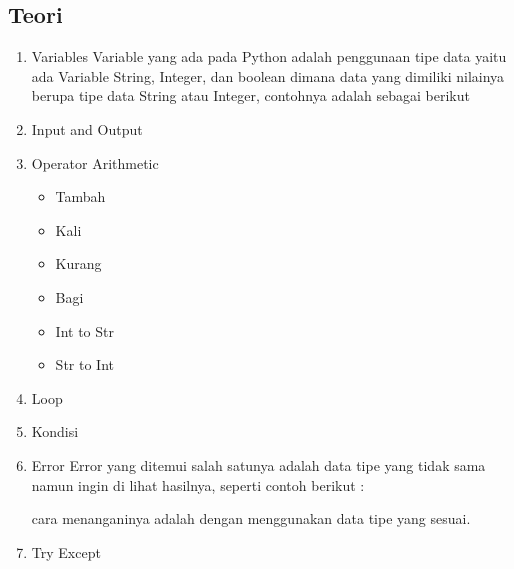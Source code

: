 \subsection{Teori}
	\begin{enumerate}
	\item Variables
	\subitem
	Variable yang ada pada Python adalah penggunaan tipe data yaitu ada Variable String,  Integer, dan boolean dimana data yang dimiliki nilainya berupa tipe data String atau Integer, contohnya adalah sebagai berikut
	\item Input and Output
		
	\item Operator Arithmetic
	\begin{itemize}
	\item Tambah
		
	\item Kali
		
	\item Kurang
		
	\item Bagi
		
	\item Int to Str
		
	\item Str to Int
		
	\end{itemize}

	\item Loop
		
	\item Kondisi
		
	\item Error
	\subitem
	Error yang ditemui salah satunya adalah data tipe yang tidak sama namun ingin di lihat hasilnya, seperti contoh berikut :
		
	cara menanganinya adalah dengan menggunakan data tipe yang sesuai.
	\item Try Except
		
	\end{enumerate}
